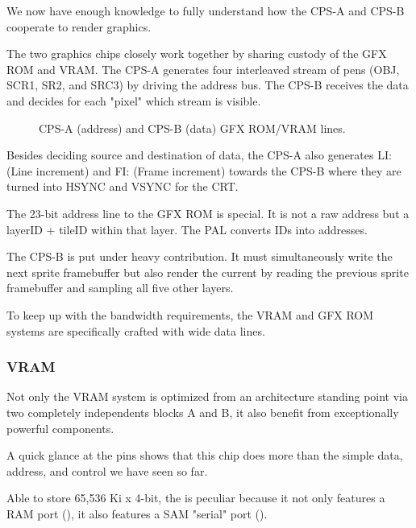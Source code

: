 We now have enough knowledge to fully understand how the CPS-A and CPS-B cooperate to render graphics.

The two graphics chips closely work together by sharing custody of the GFX ROM and VRAM. The CPS-A generates four interleaved stream of pens (OBJ, SCR1, SR2, and SRC3) by driving the address bus. The CPS-B receives the data and decides for each "pixel" which stream is visible. 

\begin{figure}[H]
\caption*{CPS-A (address) and CPS-B (data) GFX ROM/VRAM lines.}
\end{figure}

Besides deciding source and destination of data, the CPS-A also generates LI: (Line increment) and FI: (Frame increment) towards the CPS-B where they are turned into HSYNC and VSYNC for the CRT.

The 23-bit address line to the GFX ROM is special. It is not a raw address but a layerID + tileID within that layer. The PAL  converts IDs into addresses.


The CPS-B is put under heavy contribution. It must simultaneously write the next sprite framebuffer but also render the current by reading the previous sprite framebuffer and sampling all five other layers.


To keep up with the bandwidth requirements, the VRAM and GFX ROM systems are specifically crafted with wide data lines.








\subsubsection{VRAM}
Not only the VRAM system is optimized from an architecture standing point via two completely independents blocks A and B, it also benefit from exceptionally powerful components.

A quick glance at the  pins shows that this chip does more than the simple data, address, and control we have seen so far.


Able to store 65,536 Ki x 4-bit, the  is peculiar because it not only features a RAM port (), it also features a SAM "serial" port ().
 
